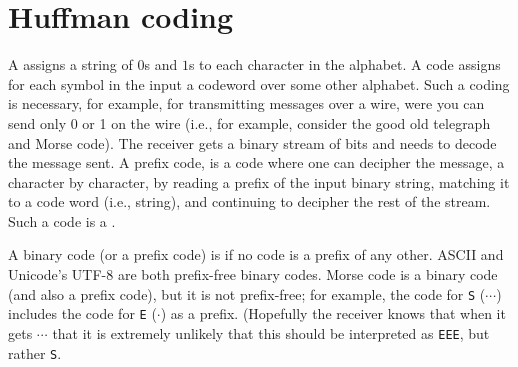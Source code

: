 %

\makeatletter
{}
\makeatother
\ifx\bookMode\undefined%
\fi


\newcommand{\costX}[1]{\mathrm{cost}\pth{#1}}
\newcommand{\codeX}[1]{\mathrm{code}\pth{#1}}
\newcommand{\lengthX}[1]{\mathrm{l{}e{}n}\pth{#1}}


\ChapterPrefix{}
\ChapterGen{}





\section{Huffman coding}

A  assigns a string of $0$s and $1$s to each
character in the alphabet. A code assigns for each symbol in the input
a codeword over some other alphabet. Such a coding is necessary, for
example, for transmitting messages over a wire, were you can send only
0 or 1 on the wire (i.e., for example, consider the good old telegraph
and Morse code). The receiver gets a binary stream of bits and needs
to decode the message sent. A prefix code, is a code where one can
decipher the message, a character by character, by reading a prefix of
the input binary string, matching it to a code word (i.e., string),
and continuing to decipher the rest of the stream. Such a code is a
.

A binary code (or a prefix code) is  if no code is
a prefix of any other.  ASCII and Unicode's U{}T{}F-$8$ are both
prefix-free binary codes. Morse code is a binary code (and also a
prefix code), but it is not prefix-free; for example, the code for
\texttt{S} ($\cdots$) includes the code for \texttt{E} ($\cdot$) as a
prefix. (Hopefully the receiver knows that when it gets $\cdots$ that
it is extremely unlikely that this should be interpreted as
\texttt{E{}E{}E}, but rather \texttt{S}.

